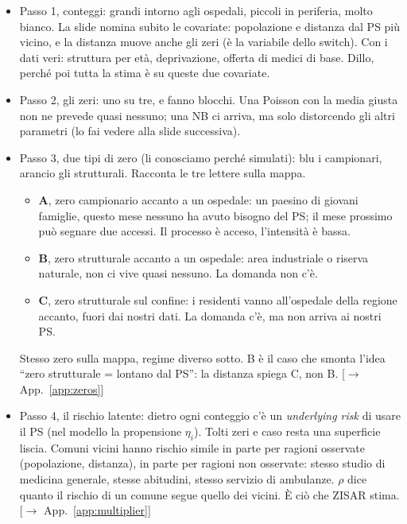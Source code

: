 \documentclass[11pt,a4paper]{article}
\newcommand{\app}[1]{{\small\color{navy}[$\to$ App.~\ref{#1}]}}
\begin{document}
\begin{itemize}[nosep]
\item Passo 1, conteggi: grandi intorno agli ospedali, piccoli in periferia, molto bianco. La slide nomina subito le covariate: popolazione e distanza dal PS più vicino, e la distanza muove anche gli zeri (è la variabile dello switch). Con i dati veri: struttura per età, deprivazione, offerta di medici di base. Dillo, perché poi tutta la stima è su queste due covariate.
\item Passo 2, gli zeri: uno su tre, e fanno blocchi. Una Poisson con la media giusta non ne prevede quasi nessuno; una NB ci arriva, ma solo distorcendo gli altri parametri (lo fai vedere alla slide successiva).
\item Passo 3, due tipi di zero (li conosciamo perché simulati): blu i campionari, arancio gli strutturali. Racconta le tre lettere sulla mappa.
\begin{itemize}[nosep]
\item \textbf{A}, zero campionario accanto a un ospedale: un paesino di giovani famiglie, questo mese nessuno ha avuto bisogno del PS; il mese prossimo può segnare due accessi. Il processo è acceso, l'intensità è bassa.
\item \textbf{B}, zero strutturale accanto a un ospedale: area industriale o riserva naturale, non ci vive quasi nessuno. La domanda non c'è.
\item \textbf{C}, zero strutturale sul confine: i residenti vanno all'ospedale della regione accanto, fuori dai nostri dati. La domanda c'è, ma non arriva ai nostri PS.
\end{itemize}
Stesso zero sulla mappa, regime diverso sotto. B è il caso che smonta l'idea ``zero strutturale = lontano dal PS'': la distanza spiega C, non B. \app{app:zeros}
\item Passo 4, il rischio latente: dietro ogni conteggio c'è un \emph{underlying risk} di usare il PS (nel modello la propensione $\eta_i$). Tolti zeri e caso resta una superficie liscia. Comuni vicini hanno rischio simile in parte per ragioni osservate (popolazione, distanza), in parte per ragioni non osservate: stesso studio di medicina generale, stesse abitudini, stesso servizio di ambulanze. $\rho$ dice quanto il rischio di un comune segue quello dei vicini. \`E ciò che ZISAR stima. \app{app:multiplier}
\end{itemize}
\end{document}
